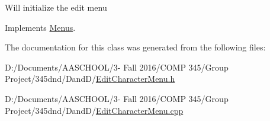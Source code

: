 Will initialize the edit menu 

Implements \hyperlink{class_menus}{Menus}.



The documentation for this class was generated from the following files\+:\begin{DoxyCompactItemize}
\item 
D\+:/\+Documents/\+A\+A\+S\+C\+H\+O\+O\+L/3-\/ Fall 2016/\+C\+O\+M\+P 345/\+Group Project/345dnd/\+Dand\+D/\hyperlink{_edit_character_menu_8h}{Edit\+Character\+Menu.\+h}\item 
D\+:/\+Documents/\+A\+A\+S\+C\+H\+O\+O\+L/3-\/ Fall 2016/\+C\+O\+M\+P 345/\+Group Project/345dnd/\+Dand\+D/\hyperlink{_edit_character_menu_8cpp}{Edit\+Character\+Menu.\+cpp}\end{DoxyCompactItemize}
